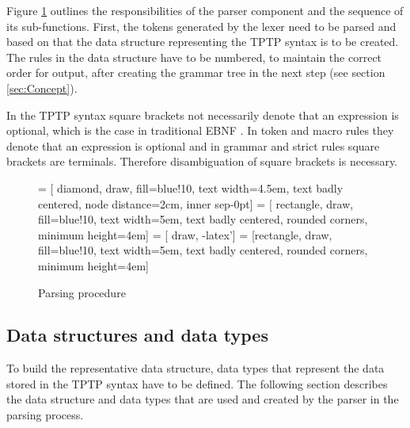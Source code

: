 Figure \ref{fig:ConceptParserFlow} outlines the responsibilities of the parser component and the sequence of its sub-functions.
First, the tokens generated by the lexer need to be parsed and based on that the data structure representing the \ac{TPTP} syntax is to be created.
The rules in the data structure have to be numbered, to maintain the correct order for output, after creating the grammar tree in the next step (see section \ref{sec:Concept}).

In the \ac{TPTP} syntax square brackets not necessarily denote that an expression is optional, which is the case in traditional \ac{EBNF} .
In token and macro rules they denote that an expression is optional and in grammar and strict rules square brackets are terminals.
Therefore disambiguation of square brackets is necessary.
\begin{figure}[H]
 = [ diamond, draw, fill=blue!10, text width=4.5em, text badly centered, node distance=2cm, inner sep-0pt]  
 = [ rectangle, draw, fill=blue!10, text width=5em, text badly centered, rounded corners, minimum height=4em]  
 = [ draw, -latex']  
 = [rectangle, draw, fill=blue!10, text width=5em, text badly centered, rounded corners, minimum height=4em]  
\begin{center}
\end{center}
\caption{Parsing procedure}
\label{fig:ConceptParserFlow}
\end{figure}

\subsection{Data structures and data types}\label{sec:ConceptParserDataStructure}
To build the representative data structure, data types that represent the data stored in the \ac{TPTP} syntax have to be defined.
The following section describes the data structure and data types that are used and created by the parser in the parsing process.

